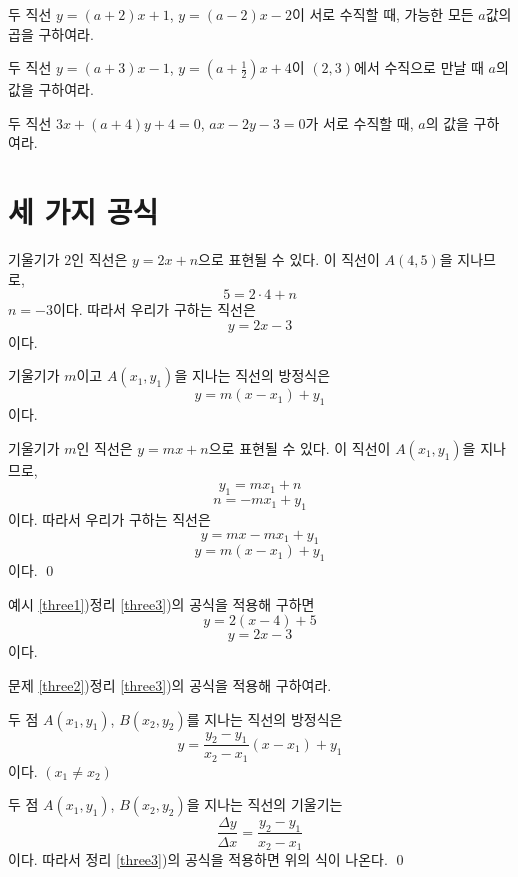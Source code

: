 \documentclass{oblivoir}
\begin{document}
\bigskip\bigskip
\prob{}\label{two11}
두 직선 \(y=(a+2)x+1\), \(y=(a-2)x-2\)이 서로 수직할 때, 가능한 모든 \(a\)값의 곱을 구하여라.

\bigskip\bigskip
\prob{}\label{two12}
두 직선 \(y=(a+3)x-1\), \(y=\left(a+\frac12\right)x+4\)이 \((2,3)\)에서 수직으로 만날 때 \(a\)의 값을 구하여라.

\bigskip\bigskip
\prob{}\label{two13}
두 직선 \(3x+(a+4)y+4=0\), \(ax-2y-3=0\)가 서로 수직할 때, \(a\)의 값을 구하여라.

\section{세 가지 공식}

\label{three1}
\begin{mdframed}
기울기가 \(2\)인 직선은 \(y=2x+n\)으로 표현될 수 있다.
이 직선이 \(A(4,5)\)을 지나므로,
\[5=2\cdot4+n\]
\(n=-3\)이다.
따라서 우리가 구하는 직선은
\[y=2x-3\]
이다.
\end{mdframed}

\label{three2}

\clearpage
\begin{mdframed}
\theo{}\label{three3}
기울기가 \(m\)이고 \(A(x_1,y_1)\)을 지나는 직선의 방정식은
\[y=m(x-x_1)+y_1\]
이다.
\end{mdframed}

\proo
기울기가 \(m\)인 직선은 \(y=mx+n\)으로 표현될 수 있다.
이 직선이 \(A(x_1,y_1)\)을 지나므로,
\[y_1=mx_1+n\]
\[n=-mx_1+y_1\]
이다.
따라서 우리가 구하는 직선은
\[y=mx-mx_1+y_1\]
\[y=m(x-x_1)+y_1\]
이다.
\qed

\exam{}\label{three4}
예시 \ref{three1})\을 정리 \ref{three3})의 공식을 적용해 구하면
\[y=2(x-4)+5\]
\[y=2x-3\]
이다.

\prob{}\label{three5}
문제 \ref{three2})\을 정리 \ref{three3})의 공식을 적용해 구하여라.

\clearpage
\begin{mdframed}
\theo{}\label{three6}
두 점 \(A(x_1,y_1)\), \(B(x_2,y_2)\)를 지나는 직선의 방정식은
\[y=\frac{y_2-y_1}{x_2-x_1}(x-x_1)+y_1\]
이다.
\((x_1\neq x_2)\)
\end{mdframed}

\proo
두 점 \(A(x_1,y_1)\), \(B(x_2,y_2)\)을 지나는 직선의 기울기는
\[\frac{\Delta y}{\Delta x}=\frac{y_2-y_1}{x_2-x_1}\]
이다.
따라서 정리 \ref{three3})의 공식을 적용하면 위의 식이 나온다.
\qed
\end{document}
